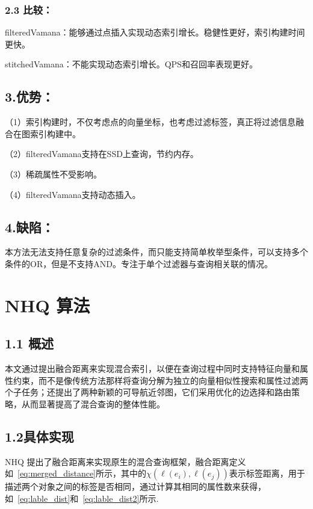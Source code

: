 \documentclass[12pt,UTF8,AutoFakeBold=2,a4paper]{ctexart} %
\newcommand{\sihao}{\fontsize{14pt}{\baselineskip}\selectfont}
\begin{document}
\subsubsection{2.3 比较：}
{\sihao \kaishu filteredVamana：能够通过点插入实现动态索引增长。稳健性更好，索引构建时间更快。}

{\sihao \kaishu stitchedVamana：不能实现动态索引增长。QPS和召回率表现更好。}


\subsection{3.优势：}
{\sihao \kaishu （1）索引构建时，不仅考虑点的向量坐标，也考虑过滤标签，真正将过滤信息融合在图索引构建中。}

{\sihao \kaishu （2）filteredVamana支持在SSD上查询，节约内存。}

{\sihao \kaishu （3）稀疏属性不受影响。}

{\sihao \kaishu （4）filteredVamana支持动态插入。}

\subsection{4.缺陷：}
{\sihao \kaishu 本方法无法支持任意复杂的过滤条件，而只能支持简单枚举型条件，可以支持多个条件的OR，但是不支持AND。专注于单个过滤器与查询相关联的情况。}



{\section{NHQ 算法}}
{\subsection{ 1.1 概述}}
本文通过提出融合距离来实现混合索引，以便在查询过程中同时支持特征向量和属性约束，而不是像传统方法那样将查询分解为独立的向量相似性搜索和属性过滤两个子任务；还提出了两种新颖的可导航近邻图，它们采用优化的边选择和路由策略，从而显著提高了混合查询的整体性能。




{\subsection{1.2具体实现}}
NHQ 提出了融合距离来实现原生的混合查询框架，融合距离定义如~\ref{eq:merged_distance}所示，其中的$\chi\left(\ell\left(e_i\right), \ell\left(e_j\right)\right)$表示标签距离，用于描述两个对象之间的标签是否相同，通过计算其相同的属性数来获得，如~\ref{eq:lable_dist}和~\ref{eq:lable_dist2}所示.
\end{document}
